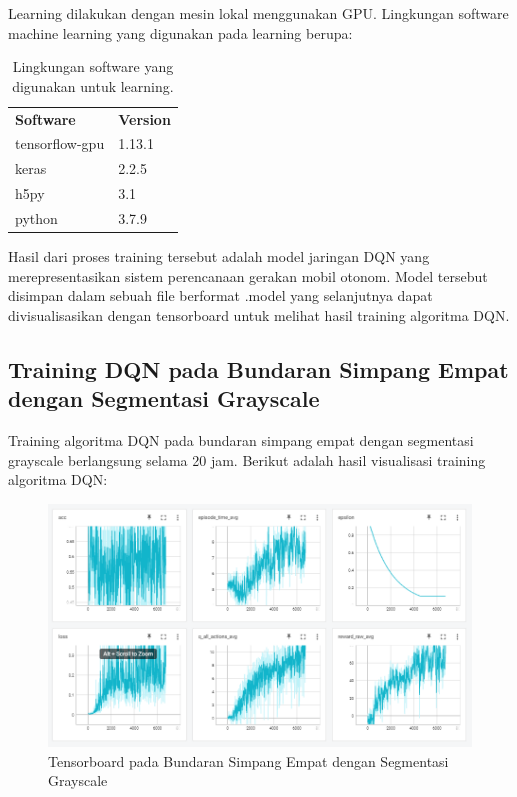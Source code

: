 \documentclass[conference]{IEEEtran}
\begin{document}
	Learning dilakukan dengan mesin lokal menggunakan GPU. Lingkungan software machine learning yang digunakan pada learning berupa:
	
	\begin{table}[H]
		\begin{tabular}{ll}
			\textbf{Software}  & \textbf{Version}              \\
			tensorflow-gpu  & 1.13.1	\\
			keras  & 2.2.5					\\
			h5py & 3.1              \\
			python & 3.7.9              \\
		\end{tabular}
		\caption{Lingkungan software yang digunakan untuk learning.}
		\label{tb:softwaresetup}
	\end{table}
	
	
	Hasil dari proses training tersebut adalah model jaringan DQN yang merepresentasikan sistem perencanaan gerakan mobil otonom. Model tersebut disimpan dalam sebuah file berformat .model yang
	selanjutnya dapat divisualisasikan dengan tensorboard untuk melihat hasil training algoritma DQN. 
	
	\subsection{Training DQN pada Bundaran Simpang Empat dengan Segmentasi Grayscale}
	\label{sec:training_dqn_bundaran_simpangempat_segmentasi_grayscale}
	
	Training algoritma DQN pada bundaran simpang empat dengan segmentasi grayscale berlangsung selama 20 jam. Berikut adalah hasil visualisasi training algoritma DQN:
	
	\begin{figure}[H] 
		\centering
		\includegraphics[width=1\linewidth]{images/tensorboard_bundaran_simpangempat_segmentasi_grayscale}
		\caption{Tensorboard pada Bundaran Simpang Empat dengan Segmentasi Grayscale}
		\label{fig:tensorboard_bundaran_simpangempat_segmentasi_grayscale}
	\end{figure}
	
\end{document}
